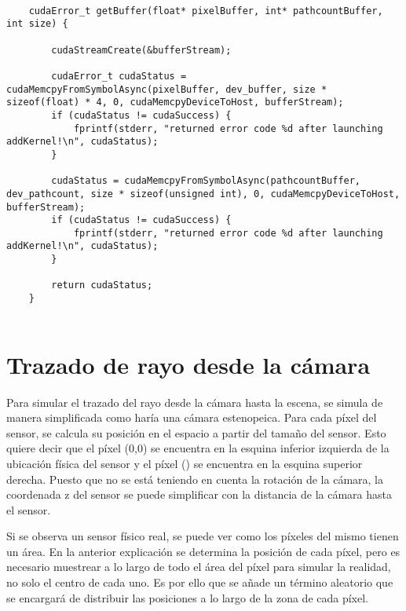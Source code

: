 \begin{minipage}[c]{0.95\textwidth}
\begin{lstlisting}[label={cod:getbuffer}, caption={Código para obtener los buffers de la GPU}]
	
	cudaError_t getBuffer(float* pixelBuffer, int* pathcountBuffer, int size) {

		cudaStreamCreate(&bufferStream);

		cudaError_t cudaStatus = cudaMemcpyFromSymbolAsync(pixelBuffer, dev_buffer, size * sizeof(float) * 4, 0, cudaMemcpyDeviceToHost, bufferStream);
		if (cudaStatus != cudaSuccess) {
			fprintf(stderr, "returned error code %d after launching addKernel!\n", cudaStatus);
		}

		cudaStatus = cudaMemcpyFromSymbolAsync(pathcountBuffer, dev_pathcount, size * sizeof(unsigned int), 0, cudaMemcpyDeviceToHost, bufferStream);
		if (cudaStatus != cudaSuccess) {
			fprintf(stderr, "returned error code %d after launching addKernel!\n", cudaStatus);
		}

		return cudaStatus;
	}
	
\end{lstlisting}
\end{minipage}


\section{Trazado de rayo desde la cámara}
\label{sec:calculatecameraray}

Para simular el trazado del rayo desde la cámara hasta la escena, se simula de manera simplificada como haría una cámara estenopeica. Para cada píxel del sensor, se calcula su posición en el espacio a partir del tamaño del sensor. Esto quiere decir que el píxel (0,0) se encuentra en la esquina inferior izquierda de la ubicación física del sensor y el píxel () se encuentra en la esquina superior derecha. Puesto que no se está teniendo en cuenta la rotación de la cámara, la coordenada z del sensor se puede simplificar con la distancia de la cámara hasta el sensor.

Si se observa un sensor físico real, se puede ver como los píxeles del mismo tienen un área. En la anterior explicación se determina la posición de cada píxel, pero es necesario muestrear a lo largo de todo el área del píxel para simular la realidad, no solo el centro de cada uno. Es por ello que se añade un término aleatorio  que se encargará de distribuir las posiciones a lo largo de la zona de cada píxel.

